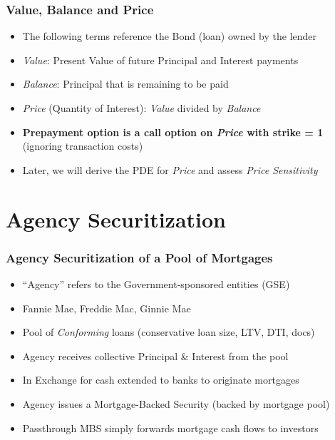 \documentclass{beamer}
\begin{document}
\begin{frame}
\frametitle{Value, Balance and Price}
\begin{itemize}
\item The following terms reference the Bond (loan) owned by the lender
\item {\em Value}: Present Value of future Principal and Interest payments
\item {\em Balance}: Principal that is remaining to be paid
\item {\em Price} (Quantity of Interest): {\em Value} divided by {\em Balance}
\item {\bf Prepayment option is a call option on {\em Price} with strike = 1} \\ (ignoring transaction costs)
\item Later, we will derive the PDE for {\em Price} and assess {\em Price Sensitivity}
\end{itemize}
\end{frame}

\section{Agency Securitization}

\begin{frame}
\frametitle{Agency Securitization of a Pool of Mortgages}
\begin{itemize}
\item ``Agency'' refers to the Government-sponsored entities (GSE)
\item Fannie Mae, Freddie Mac, Ginnie Mae
\item Pool of {\em Conforming} loans (conservative loan size, LTV, DTI, docs)
\item Agency receives collective Principal \& Interest from the pool
\item In Exchange for cash extended to banks to originate mortgages
\item Agency issues a Mortgage-Backed Security (backed by mortgage pool)
\item Passthrough MBS simply forwards mortgage cash flows to investors
\end{itemize}
\end{frame}
\end{document}
